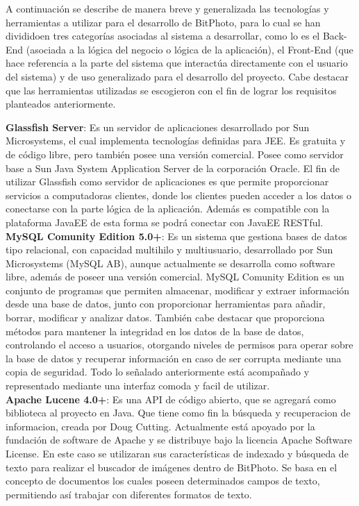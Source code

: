 \documentclass{memoria}
\begin{document}

A continuación se describe de manera breve y generalizada las tecnologías y herramientas a utilizar para el desarrollo de BitPhoto, para lo cual se han divididoen tres categorías asociadas al sistema a desarrollar, como lo es el Back-End (asociada a la lógica del negocio o lógica de la aplicación), el Front-End (que hace referencia a la parte del sistema que interactúa directamente con el usuario del sistema) y de uso generalizado para el desarrollo del proyecto.  Cabe destacar que las herramientas utilizadas se escogieron con el fin de lograr los requisitos planteados anteriormente.\\


\textbf{Glassfish Server}: Es un servidor de aplicaciones desarrollado por Sun Microsystems, el cual implementa tecnologías definidas para JEE. Es gratuita y de código libre, pero también posee una versión comercial. Posee como servidor base a Sun Java System Application Server de la corporación Oracle. El fin de utilizar Glassfish como servidor de aplicaciones es que permite proporcionar servicios a computadoras clientes, donde los clientes pueden acceder a los datos o conectarse con la parte lógica de la aplicación. Además es compatible con la plataforma JavaEE de esta forma se podrá conectar con JavaEE RESTful.\\

\textbf{MySQL Comunity Edition 5.0+}: Es un sistema que gestiona bases de datos tipo relacional, con capacidad multihilo y multiusuario, desarrollado por Sun Microsystems (MySQL AB), aunque actualmente se desarrolla como software libre, además de poseer una versión comercial. MySQL Comunity Edition es un conjunto de programas que permiten almacenar, modificar y extraer información desde una base de datos, junto con proporcionar herramientas para añadir, borrar, modificar y analizar datos. También cabe destacar que proporciona métodos para mantener la integridad en los datos de la base de datos, controlando el acceso a usuarios, otorgando niveles de permisos para operar sobre la base de datos y recuperar información en caso de ser corrupta mediante una copia de seguridad. Todo lo señalado anteriormente está acompañado y representado mediante una interfaz comoda y facil de utilizar.\\

\textbf{Apache Lucene 4.0+}: Es una API de código abierto, que se agregará como biblioteca al proyecto en Java. Que tiene como fin la búsqueda y recuperacion de informacion, creada por Doug Cutting. Actualmente está apoyado por la fundación de software de Apache y se distribuye bajo la licencia Apache Software License. En este caso se utilizaran sus características de indexado y búsqueda de texto para realizar el buscador de imágenes dentro de BitPhoto. Se basa en el concepto de documentos los cuales poseen determinados campos de texto, permitiendo así trabajar con diferentes formatos de texto.\\
\end{document}
